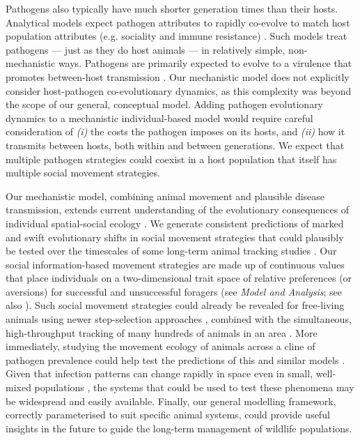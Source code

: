 Pathogens also typically have much shorter generation times than their hosts.
Analytical models expect pathogen attributes to rapidly co-evolve to match host population attributes (e.g. sociality and immune resistance) \citep[][]{bonds2005,prado2009,ashby2022}.
Such models treat pathogens --- just as they do host animals --- in relatively simple, non-mechanistic ways.
Pathogens are primarily expected to evolve to a virulence that promotes between-host transmission \citep{bonds2005}.
Our mechanistic model does not explicitly consider host-pathogen co-evolutionary dynamics, as this complexity was beyond the scope of our general, conceptual model.
Adding pathogen evolutionary dynamics to a mechanistic individual-based model would require careful consideration of \textit{(i)} the costs the pathogen imposes on its hosts, and \textit{(ii)} how it transmits between hosts, both within and between generations.
We expect that multiple pathogen strategies could coexist in a host population that itself has multiple social movement strategies.

Our mechanistic model, combining animal movement and plausible disease transmission, extends current understanding of the evolutionary consequences of individual spatial-social ecology \citep{webber2018,albery2021,webber2022}.
We generate consistent predictions of marked and swift evolutionary shifts in social movement strategies that could plausibly be tested over the timescales of some long-term animal tracking studies \citep{wilber2022}.
Our social information-based movement strategies are made up of continuous values that place individuals on a two-dimensional trait space of relative preferences (or aversions) for successful and unsuccessful foragers (see \textit{Model and Analysis}; see also \citealt{gupte2021a}).
Such social movement strategies could already be revealed for free-living animals using newer step-selection approaches \citep{avgar2016}, combined with the simultaneous, high-throughput tracking of many hundreds of animals in an area \citep{nathan2022}.
More immediately, studying the movement ecology of animals across a cline of pathogen prevalence could help test the predictions of this and similar models \citep{wilber2022}.
Given that infection patterns can change rapidly in space even in small, well-mixed populations \citep{albery2022}, the systems that could be used to test these phenomena may be widespread and easily available.
Finally, our general modelling framework, correctly parameterised to suit specific animal systems, could provide useful insights in the future to guide the long-term management of wildlife populations.

